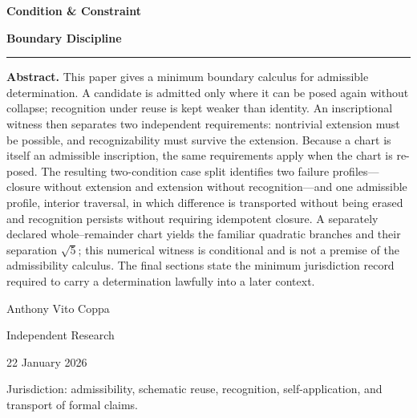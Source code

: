 \documentclass[11pt,letterpaper]{article}
\theoremstyle{constraintstyle}
\begin{document}
\hypersetup{pageanchor=false}

\begin{titlepage}
\thispagestyle{empty}
\vspace*{0.10\textheight}

{\fontsize{30}{35}\selectfont\bfseries\color{onyx} Condition \& Constraint\par}
\vspace{0.7em}
{\fontsize{18}{23}\selectfont\bfseries Boundary Discipline\par}

\vspace{2.1em}
\color{gold}\rule{0.62\textwidth}{1.1pt}\color{black}
\vspace{2.0em}

\begin{abstractbox}
\textbf{Abstract.}
This paper gives a minimum boundary calculus for admissible determination.  A candidate is admitted only where it can be posed again without collapse; recognition under reuse is kept weaker than identity.  An inscriptional witness then separates two independent requirements: nontrivial extension must be possible, and recognizability must survive the extension.  Because a chart is itself an admissible inscription, the same requirements apply when the chart is re-posed.  The resulting two-condition case split identifies two failure profiles---closure without extension and extension without recognition---and one admissible profile, interior traversal, in which difference is transported without being erased and recognition persists without requiring idempotent closure.  A separately declared whole--remainder chart yields the familiar quadratic branches and their separation $\sqrt5$; this numerical witness is conditional and is not a premise of the admissibility calculus.  The final sections state the minimum jurisdiction record required to carry a determination lawfully into a later context.
\end{abstractbox}

\vfill
{\large Anthony Vito Coppa\par}
{\large Independent Research\par}
{\large 22 January 2026\par}
\vspace{0.6em}
{\small Jurisdiction: admissibility, schematic reuse, recognition, self-application, and transport of formal claims.\par}
\end{titlepage}
\hypersetup{pageanchor=true}
\end{document}
